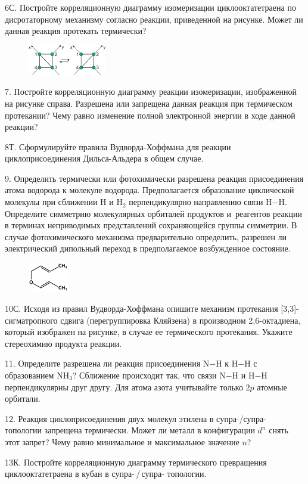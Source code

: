 6С. Постройте корреляционную диаграмму изомеризации  циклооктатетраена по дисротаторному механизму согласно реакции, приведенной на рисунке. Может ли данная реакция протекать термически?
\par
\begin{figure} %
    \centering
    \vspace{-1mm}
    \includegraphics[width=34mm]{images/Fig_2_1_7.png}
    \vspace{-3.5mm}
\end{figure}
7. Постройте корреляционную диаграмму реакции изомеризации, изображенной на рисунке справа. Разрешена или запрещена данная реакция при термическом протекании? Чему равно изменение полной электронной энергии в ходе данной реакции?
\par
8Т. Сформулируйте правила Вудворда-Хоффмана для реакции циклоприсоединения Дильса-Альдера в общем случае.
\par
9. Определить термически или фотохимически разрешена реакция присоединения атома водорода к молекуле водорода. Предполагается образование циклической молекулы при сближении $\text{H}$ и $\text{H}_2$ перпендикулярно направлению связи $\text{H}$$-$$\text{H}$. Определите симметрию молекулярных орбиталей продуктов и~реагентов реакции в терминах неприводимых представлений сохраняющейся группы симметрии. В случае фотохимического механизма предварительно определить, разрешен ли электрический дипольный переход в предполагаемое возбужденное состояние.
\par
\begin{figure} %
    \centering
    \vspace{-3mm}
    \includegraphics[width=17.5mm]{images/Fig_2_1_10.png}
    \vspace{-5mm}
\end{figure}
10С. Исходя из правил Вудворда-Хоффмана опишите механизм протекания [3,3]-сигматропного сдвига (перегруппировка Кляйзена) в производном 2,6-октадиена, который изображен на рисунке, в случае ее термического протекания. Укажите стереохимию продукта реакции.
\par
11. Определите разрешена ли реакция присоединения $\text{N}$$-$$\text{H}$ к $\text{H}$$-$$\text{H}$ с образованием NH$_3$? Сближение происходит так, что связи $\text{N}$$-$$\text{H}$ и $\text{H}$$-$$\text{H}$ перпендикулярны друг другу. Для атома азота учитывайте только $2p$ атомные орбитали.
\par
12. Реакция циклоприсоединения двух молекул этилена в супра-/супра- топологии запрещена термически. Может ли металл в конфигурации $d^n$ снять этот запрет? Чему равно минимальное и максимальное значение $n$?
\par
13К. Постройте корреляционную диаграмму термического превращения циклооктатетраена в кубан в супра-\,/\,супра- топологии.
\par